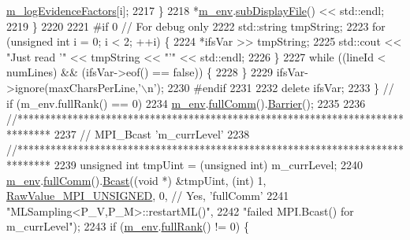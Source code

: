 \begin{DoxyCode}
      \hyperlink{class_q_u_e_s_o_1_1_m_l_sampling_a75f2ceab4a2c6774b3fa07d74221dbf3}{m\_logEvidenceFactors}[i];
2217       \}
2218       *\hyperlink{class_q_u_e_s_o_1_1_m_l_sampling_a13f1ca4fe9f94822fe572a743eaced1d}{m\_env}.\hyperlink{class_q_u_e_s_o_1_1_base_environment_a8a0064746ae8dddfece4229b9ad374d6}{subDisplayFile}() << std::endl;
2219     \}
2220 
2221 \textcolor{preprocessor}{#if 0 // For debug only}
2222 \textcolor{preprocessor}{}    std::string tmpString;
2223     \textcolor{keywordflow}{for} (\textcolor{keywordtype}{unsigned} \textcolor{keywordtype}{int} i = 0; i < 2; ++i) \{
2224       *ifsVar >> tmpString;
2225       std::cout << \textcolor{stringliteral}{"Just read '"} << tmpString << \textcolor{stringliteral}{"'"} << std::endl;
2226     \}
2227     \textcolor{keywordflow}{while} ((lineId < numLines) && (ifsVar->eof() == \textcolor{keyword}{false})) \{
2228     \}
2229     ifsVar->ignore(maxCharsPerLine,\textcolor{charliteral}{'\(\backslash\)n'});
2230 \textcolor{preprocessor}{#endif}
2231 \textcolor{preprocessor}{}
2232     \textcolor{keyword}{delete} ifsVar;
2233   \} \textcolor{comment}{// if (m\_env.fullRank() == 0)}
2234   \hyperlink{class_q_u_e_s_o_1_1_m_l_sampling_a13f1ca4fe9f94822fe572a743eaced1d}{m\_env}.\hyperlink{class_q_u_e_s_o_1_1_base_environment_a0b0779b41ff304058856e97e1d16b4d4}{fullComm}().\hyperlink{class_q_u_e_s_o_1_1_mpi_comm_a4059971c30e023b272fccaa6aa00c426}{Barrier}();
2235 
2236   \textcolor{comment}{//******************************************************************************}
2237   \textcolor{comment}{// MPI\_Bcast 'm\_currLevel'}
2238   \textcolor{comment}{//******************************************************************************}
2239   \textcolor{keywordtype}{unsigned} \textcolor{keywordtype}{int} tmpUint = (\textcolor{keywordtype}{unsigned} int) m\_currLevel;
2240   \hyperlink{class_q_u_e_s_o_1_1_m_l_sampling_a13f1ca4fe9f94822fe572a743eaced1d}{m\_env}.\hyperlink{class_q_u_e_s_o_1_1_base_environment_a0b0779b41ff304058856e97e1d16b4d4}{fullComm}().\hyperlink{class_q_u_e_s_o_1_1_mpi_comm_abd6af8db8b0c7fd2f5b62e26477a9537}{Bcast}((\textcolor{keywordtype}{void} *) &tmpUint, (\textcolor{keywordtype}{int}) 1, 
      \hyperlink{_mpi_comm_8h_a06cbfbc33436f6e0dc8a48ff3c49bdfc}{RawValue\_MPI\_UNSIGNED}, 0, \textcolor{comment}{// Yes, 'fullComm'}
2241                          \textcolor{stringliteral}{"MLSampling<P\_V,P\_M>::restartML()"},
2242                          \textcolor{stringliteral}{"failed MPI.Bcast() for m\_currLevel"});
2243   \textcolor{keywordflow}{if} (\hyperlink{class_q_u_e_s_o_1_1_m_l_sampling_a13f1ca4fe9f94822fe572a743eaced1d}{m\_env}.\hyperlink{class_q_u_e_s_o_1_1_base_environment_a84a239e42ae443cf71db6e03e8159620}{fullRank}() != 0) \{

\end{DoxyCode}
